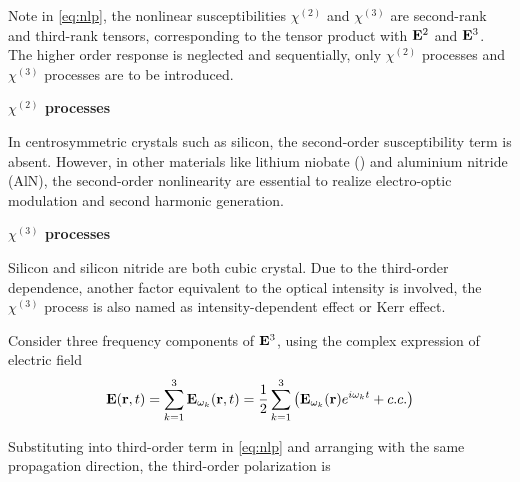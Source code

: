 Note in \autoref{eq:nlp}, the nonlinear susceptibilities $\chi^{(2)}$ and $\chi^{(3)}$ are second-rank and third-rank tensors, corresponding to the tensor product with $\vb{E}^2$ and $\vb{E}^3$. The higher order response is neglected and sequentially, only $\chi^{(2)}$ processes and $\chi^{(3)}$ processes are to be introduced.

\bigskip
\noindent\textbf{$\chi^{(2)}$ processes} 

In centrosymmetric crystals such as silicon, the second-order susceptibility term is absent. However, in other materials like lithium niobate () and aluminium nitride (AlN), the second-order nonlinearity are essential to realize electro-optic modulation and second harmonic generation.

\bigskip
\noindent\textbf{$\chi^{(3)}$ processes} 

Silicon and silicon nitride are both cubic crystal. Due to the third-order dependence, another factor equivalent to the optical intensity is involved, the $\chi^{(3)}$ process is also named as intensity-dependent effect or Kerr effect.

Consider three frequency components of $\vb{E}^3$, using the complex expression of electric field
\begin{equation}
    \vb{E}(\vb{r}, t) = \sum_{k=1}^3 \vb{E}_{\omega_k}(\vb{r}, t) =  \frac{1}{2} \sum_{k=1}^3 \qty ( \vb{E}_{\omega_k}(\vb{r})e^{i\omega_k t} + c.c.)
\end{equation}
\begin{figure}
    
    \label{fig:energy-level}
\end{figure}
Substituting into third-order term in \autoref{eq:nlp} and arranging with the same propagation direction, the third-order polarization is 


